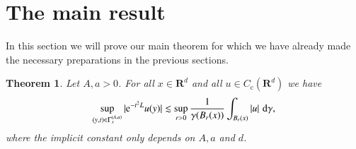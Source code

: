 \documentclass[preprint,12pt]{elsarticle}
\newtheorem{theorem}{Theorem}
\theoremstyle{remark}
\newcommand{\D}{\,\textup{d}}
\newcommand{\CcR}{{C_{\text{c}}(\R^d)}}
\newcommand{\R}{\mathbf R}
\newcommand{\e}{\mathrm{e}} %
\begin{document}
\section{The main result}
In this section we will prove our main theorem for which we have already made
the necessary preparations in the previous sections.
\begin{theorem}\label{thm:Gaussian-maximal-function}
  Let $A, a > 0$. For all $x \in \R^d$ and all $u \in \CcR$ we have
  \begin{equation}
    \label{eq:Maximal-function-cone}
    \sup_{(y, t) \in \Gamma_x^{(A, a)}} |\e^{-t^2 L} u(y)| \lesssim
    \sup_{r > 0} \frac1{\gamma(B_r(x))}\int_{B_r(x)} |u| \, \D\gamma,
  \end{equation}
  where the implicit constant only depends on $A, a$ and $d$.
\end{theorem}
\end{document}
